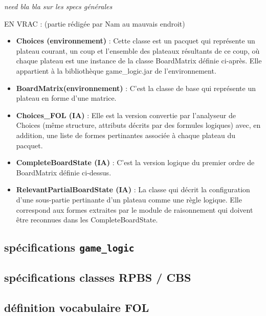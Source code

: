 \emph{need bla bla sur les specs générales}

EN VRAC :
(partie rédigée par Nam au mauvais endroit)

\begin{itemize}
  \item \textbf {Choices (environnement)} : Cette classe est un pacquet qui représente un plateau courant, un coup et l'ensemble des plateaux résultants de ce coup, où chaque plateau est une instance de la classe BoardMatrix définie ci-après. Elle appartient à la bibliothèque game\_logic.jar de l'environnement.
  \item \textbf {BoardMatrix(environnement)} : C'est la classe de base qui représente un plateau en forme d'une matrice. 
  \item \textbf {Choices\_FOL (IA)} : Elle est la version convertie par l'analyseur de Choices (même structure, attributs décrits par des formules logiques) avec, en addition, une liste de formes pertinantes associée à chaque plateau du pacquet.
  \item \textbf {CompleteBoardState (IA)} : C'est la version logique du premier ordre de
  BoardMatrix définie ci-dessus.
  \item \textbf {RelevantPartialBoardState (IA)} : La classe qui décrit la configuration d'une sous-partie pertinante d'un plateau comme une règle logique. Elle correspond aux \og formes \fg{} extraites par le module de raisonnement qui doivent être reconnues dans les CompleteBoardState.
\end{itemize}

\subsection{spécifications \texttt{game\_logic}}
\label{specs_game_logic}
\subsection{spécifications classes RPBS / CBS}
\label{specs_shared_classes}
\subsection{définition vocabulaire FOL}
\label{specs_voc_fol}